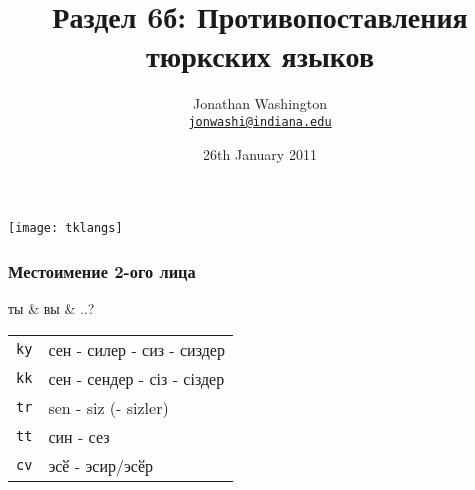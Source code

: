 \documentclass[10pt,xetex]{beamer} %
\date{26th January 2011}
\title{{\cyrtext Раздел 6б: Противопоставления тюркских языков}}
\author{Jonathan Washington \\ \texttt{\href{mailto:jonwashi@indiana.edu}{jonwashi@indiana.edu}}}
\begin{document}
\begin{frame}
	\titlepage
	\MyLogoBottomCentred
\end{frame}



%
%
\begin{frame}
	\texttt{[image: tklangs]}
\end{frame}

\begin{frame}
	\frametitle{Местоимение 2-ого лица}
	\begin{block}{ты \& вы \& ..?}
	\begin{tabular}{ll}
		\texttt{ky} & сен - силер - сиз - сиздер \\
		\texttt{kk} & сен - сендер - сіз - сіздер \\
		\texttt{tr} & sen - siz (- sizler) \\
		\texttt{tt} & син - сез \\
		\texttt{cv} & эсӗ - эсир/эсӗр \\
	\end{tabular}
	\end{block}
\end{frame}
\end{document}
